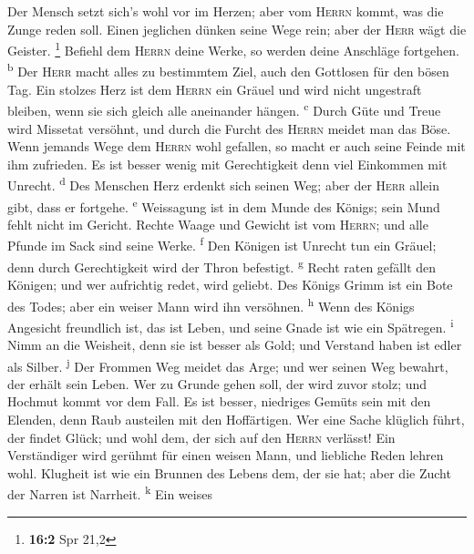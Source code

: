  Der Mensch setzt sich's wohl vor im Herzen; aber vom
\textsc{Herrn} kommt, was die Zunge reden soll.  Einen
jeglichen dünken seine Wege rein; aber der \textsc{Herr} wägt die
Geister. \footnote{\textbf{16:2} Spr 21,2}  Befiehl dem
\textsc{Herrn} deine Werke, so werden deine Anschläge fortgehen.
\textsuperscript{b}  Der \textsc{Herr} macht alles zu
bestimmtem Ziel, auch den Gottlosen für den bösen Tag. 
Ein stolzes Herz ist dem \textsc{Herrn} ein Gräuel und wird nicht
ungestraft bleiben, wenn sie sich gleich alle aneinander hängen.
\textsuperscript{c}  Durch Güte und Treue wird Missetat
versöhnt, und durch die Furcht des \textsc{Herrn} meidet man das Böse.
 Wenn jemands Wege dem \textsc{Herrn} wohl gefallen, so
macht er auch seine Feinde mit ihm zufrieden.  Es ist
besser wenig mit Gerechtigkeit denn viel Einkommen mit Unrecht.
\textsuperscript{d}  Des Menschen Herz erdenkt sich seinen
Weg; aber der \textsc{Herr} allein gibt, dass er fortgehe.
\textsuperscript{e}  Weissagung ist in dem Munde des
Königs; sein Mund fehlt nicht im Gericht.  Rechte Waage
und Gewicht ist vom \textsc{Herrn}; und alle Pfunde im Sack sind seine
Werke. \textsuperscript{f}  Den Königen ist Unrecht tun
ein Gräuel; denn durch Gerechtigkeit wird der Thron befestigt.
\textsuperscript{g}  Recht raten gefällt den Königen; und
wer aufrichtig redet, wird geliebt.  Des Königs Grimm ist
ein Bote des Todes; aber ein weiser Mann wird ihn versöhnen.
\textsuperscript{h}  Wenn des Königs Angesicht freundlich
ist, das ist Leben, und seine Gnade ist wie ein Spätregen.
\textsuperscript{i}  Nimm an die Weisheit, denn sie ist
besser als Gold; und Verstand haben ist edler als Silber.
\textsuperscript{j}  Der Frommen Weg meidet das Arge; und
wer seinen Weg bewahrt, der erhält sein Leben.  Wer zu
Grunde gehen soll, der wird zuvor stolz; und Hochmut kommt vor dem Fall.
 Es ist besser, niedriges Gemüts sein mit den Elenden,
denn Raub austeilen mit den Hoffärtigen.  Wer eine Sache
klüglich führt, der findet Glück; und wohl dem, der sich auf den
\textsc{Herrn} verlässt!  Ein Verständiger wird gerühmt
für einen weisen Mann, und liebliche Reden lehren wohl. 
Klugheit ist wie ein Brunnen des Lebens dem, der sie hat; aber die Zucht
der Narren ist Narrheit. \textsuperscript{k}  Ein weises

